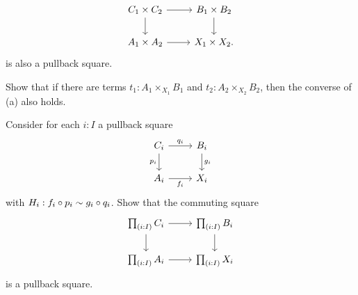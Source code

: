 \begin{exercises}
\begin{subexenum}
\begin{equation*}
\begin{tikzcd}
C_1\times C_2 \arrow[r] \arrow[d] & B_1\times B_2 \arrow[d] \\
A_1 \times A_2 \arrow[r] & X_1\times X_2. 
\end{tikzcd}
\end{equation*}
is also a pullback square.
\item Show that if there are terms $t_1:A_1\times_{X_1}B_1$ and $t_2:A_2\times_{X_2}B_2$, then the converse of (a) also holds.
\end{subexenum}
\item Consider for each $i:I$ a pullback square
\begin{equation*}
\begin{tikzcd}
C_i \arrow[r,"q_i"] \arrow[d,swap,"p_i"] & B_i \arrow[d,"g_i"] \\
A_i \arrow[r,swap,"f_i"] & X_i
\end{tikzcd}
\end{equation*}
with $H_i: f_i\circ p_i\sim g_i\circ q_i$.\label{ex:pb_pi}
Show that the commuting square
\begin{equation*}
\begin{tikzcd}
\prd{i:I}C_i \arrow[r] \arrow[d] & \prd{i:I}B_i \arrow[d] \\
\prd{i:I}A_i \arrow[r] & \prd{i:I}X_i
\end{tikzcd}
\end{equation*}
is a pullback square.

\end{exercises}
